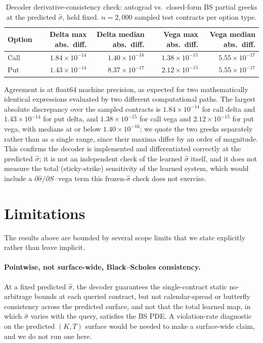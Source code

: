 \documentclass[11pt]{article}
\begin{document}
\begin{table}[t]
\centering
\small
\caption{Decoder derivative-consistency check: autograd vs.\ closed-form BS partial greeks at the
predicted $\hat\sigma$, held fixed. $n{=}2{,}000$ sampled test contracts per option type.}
\label{tab:greeks}
\begin{tabular}{lrrrr}
\toprule
Option & Delta max abs.\ diff. & Delta median abs.\ diff. & Vega max abs.\ diff. & Vega median abs.\ diff. \\
\midrule
Call & $1.84\times10^{-14}$ & $1.40\times10^{-16}$ & $1.38\times10^{-15}$ & $5.55\times10^{-17}$ \\
Put  & $1.43\times10^{-14}$ & $8.37\times10^{-17}$ & $2.12\times10^{-15}$ & $5.55\times10^{-17}$ \\
\bottomrule
\end{tabular}
\end{table}

Agreement is at float64 machine precision, as expected for two mathematically identical expressions
evaluated by two different computational paths. The largest absolute discrepancy over the sampled
contracts is $1.84\times10^{-14}$ for call delta and $1.43\times10^{-14}$ for put delta, and
$1.38\times10^{-15}$ for call vega and $2.12\times10^{-15}$ for put vega, with medians at or below
$1.40\times10^{-16}$; we quote the two greeks separately rather than as a single range, since their
maxima differ by an order of magnitude. This confirms the decoder is implemented and
differentiated correctly at the predicted $\hat\sigma$; it is not an independent check of the learned
$\hat\sigma$ itself, and it does not measure the total (sticky-strike) sensitivity of the learned
system, which would include a $\partial \hat\sigma/\partial S \cdot \text{vega}$ term this
frozen-$\hat\sigma$ check does not exercise.

\section{Limitations}
\label{sec:limitations}

The results above are bounded by several scope limits that we state explicitly rather than leave
implicit.

\paragraph{Pointwise, not surface-wide, Black--Scholes consistency.} At a fixed predicted $\hat\sigma$,
the decoder guarantees the single-contract static no-arbitrage bounds at each queried contract, but not
calendar-spread or butterfly consistency across the predicted surface, and not that the total learned
map, in which $\hat\sigma$ varies with the query, satisfies the BS PDE. A violation-rate diagnostic on
the predicted $(K,T)$ surface would be needed to make a surface-wide claim, and we do not run one here.
\end{document}
